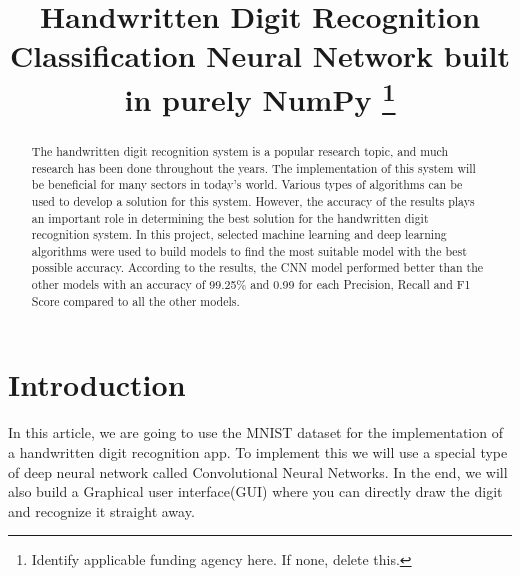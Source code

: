 \documentclass[conference]{IEEEtran}
\begin{document}
\title{Handwritten Digit Recognition\\
{\footnotesize Classification Neural Network built in purely NumPy}
\thanks{Identify applicable funding agency here. If none, delete this.}
}

\author{
}

\maketitle

\begin{abstract}
The handwritten digit recognition system is a popular research topic, and much research has been done throughout the years. The implementation of this system will be beneficial for many sectors in today's world. Various types of algorithms can be used to develop a solution for this system. However, the accuracy of the results plays an important role in determining the best solution for the handwritten digit recognition system. In this project, selected machine learning and deep learning algorithms were used to build models to find the most suitable model with the best possible accuracy. According to the results, the CNN model performed better than the other models with an accuracy of 99.25\% and 0.99 for each Precision, Recall and F1 Score compared to all the other models.
\end{abstract}

\section{Introduction}
In this article, we are going to use the MNIST dataset for the implementation of a handwritten digit recognition app. To implement this we will use a special type of deep neural network called Convolutional Neural Networks. In the end, we will also build a Graphical user interface(GUI) where you can directly draw the digit and recognize it straight away.
\end{document}
